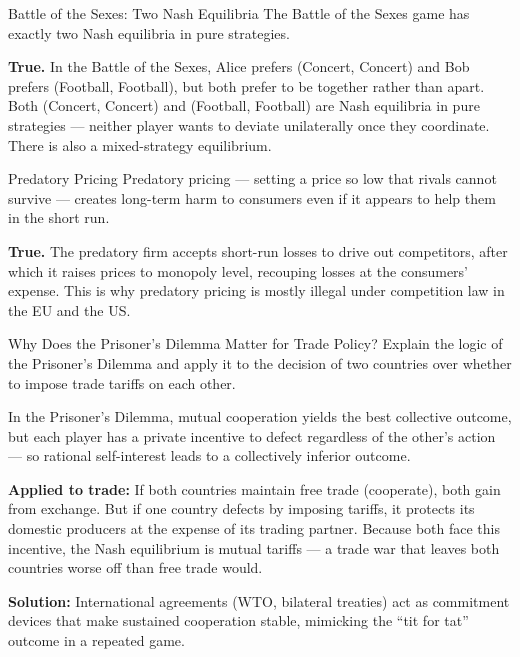 \documentclass[paper=a5]{scrartcl}
\begin{document}
\begin{question}[type=tf]{Battle of the Sexes: Two Nash Equilibria}
The Battle of the Sexes game has exactly two Nash equilibria in pure
strategies.
\truefalse[true]
\begin{solution}
  \textbf{True.} In the Battle of the Sexes, Alice prefers (Concert, Concert)
  and Bob prefers (Football, Football), but both prefer to be together rather
  than apart. Both (Concert, Concert) and (Football, Football) are Nash
  equilibria in pure strategies — neither player wants to deviate unilaterally
  once they coordinate. There is also a mixed-strategy equilibrium.
\end{solution}
\end{question}

\begin{question}[type=tf]{Predatory Pricing}
Predatory pricing — setting a price so low that rivals cannot survive —
creates long-term harm to consumers even if it appears to help them in
the short run.
\truefalse[true]
\begin{solution}
  \textbf{True.} The predatory firm accepts short-run losses to drive out
  competitors, after which it raises prices to monopoly level, recouping
  losses at the consumers' expense. This is why predatory pricing is mostly
  illegal under competition law in the EU and the US.
\end{solution}
\end{question}

\begin{question}[type=open]{Why Does the Prisoner's Dilemma Matter for Trade Policy?}
Explain the logic of the Prisoner's Dilemma and apply it to the decision of
two countries over whether to impose trade tariffs on each other.

\answerlines[7]

\begin{solution}
  In the Prisoner's Dilemma, mutual cooperation yields the best collective
  outcome, but each player has a private incentive to defect regardless of
  the other's action — so rational self-interest leads to a collectively
  inferior outcome.

  \textbf{Applied to trade:} If both countries maintain free trade (cooperate),
  both gain from exchange. But if one country defects by imposing tariffs, it
  protects its domestic producers at the expense of its trading partner.
  Because both face this incentive, the Nash equilibrium is mutual tariffs —
  a trade war that leaves both countries worse off than free trade would.

  \textbf{Solution:} International agreements (WTO, bilateral treaties) act as
  commitment devices that make sustained cooperation stable, mimicking the
  ``tit for tat'' outcome in a repeated game.
\end{solution}
\end{question}
\end{document}
